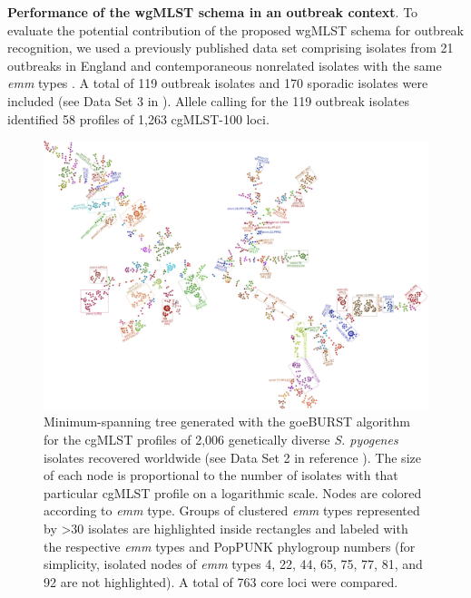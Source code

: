 \textbf{Performance of the wgMLST schema in an outbreak context}. To evaluate the potential contribution of the proposed \ac{wgMLST} schema for outbreak recognition, we used a previously published data set comprising isolates from 21 outbreaks in England and contemporaneous nonrelated isolates with the same \textit{emm} types \cite{coelho_genomic_2019}. A total of 119 outbreak isolates and 170 sporadic isolates were included (see Data Set 3 in \cite{friaes_supplemental_2023}). Allele calling for the 119 outbreak isolates identified 58 profiles of 1,263 cgMLST-100 loci.

\begin{landscape}
\begin{figure}[!ht]
    \centering
    \includegraphics[height=0.85\textheight]{figures/chapter 4/Figure2.pdf}
    \caption[Minimum-spanning tree generated with the goeBURST algorithm for the \ac{cgMLST} profiles of 2,006 genetically diverse \textit{S. pyogenes} isolates recovered worldwide.]{Minimum-spanning tree generated with the goeBURST algorithm for the \ac{cgMLST} profiles of 2,006 genetically diverse \textit{S. pyogenes} isolates recovered worldwide \cite{davies_atlas_2019} (see Data Set 2 in reference \cite{friaes_supplemental_2023}). The size of each node is proportional to the number of isolates with that particular \ac{cgMLST} profile on a logarithmic scale. Nodes are colored according to \textit{emm} type. Groups of clustered \textit{emm} types represented by >30 isolates are highlighted inside rectangles and labeled with the respective \textit{emm} types and PopPUNK phylogroup numbers (for simplicity, isolated nodes of \textit{emm} types 4, 22, 44, 65, 75, 77, 81, and 92 are not highlighted). A total of 763 core loci were compared.}
    \label{fig:chap4_figure2}
\end{figure}
\end{landscape}

